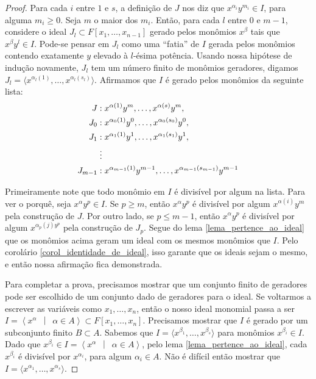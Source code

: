 \documentclass[12pt,a4paper]{report}
\newcommand{\suchthat}{\enspace\middle|\enspace}
\numberwithin{theorem}{chapter}
\begin{document}
\begin{proof}
  Para cada \(i\) entre \(1\) e \(s\), a definição de \(J\) nos diz
  que \(x^{\alpha_i} y^{m_i} \in I\), para alguma \(m_i \geq 0\).
  Seja \(m\) o maior dos \(m_i\).  Então, para cada \(l\) entre \(0\)
  e \(m - 1\), considere o ideal \(J_l \subset F[x_1,\ldots,x_{n-1}]\)
  gerado pelos monômios \(x^\beta\) tais que \(x^\beta y^l \in I\).
  Pode-se pensar em \(J_l\) como uma ``fatia'' de \(I\) gerada pelos
  monômios contendo exatamente \(y\) elevado à \(l\)-ésima potência.
  Usando nossa hipótese de indução novamente, \(J_l\) tem um número
  finito de monômios geradores, digamos \(J_l = \langle
  x^{\alpha_l(1)},\ldots,x^{\alpha_l(s_l)} \rangle\).  Afirmamos
  que \(I\) é gerado pelos monômios da seguinte lista:
  \begin{align*}
    J   &: x^{\alpha(1)}y^m,\ldots,x^{\alpha(s)}y^m,\\
    J_0 &: x^{\alpha_0(1)}y^0,\ldots,x^{\alpha_0(s_0)}y^0,\\
    J_1 &: x^{\alpha_1(1)}y^1,\ldots,x^{\alpha_1(s_1)}y^1,\\
        &\vdotswithin{:}\\
    J_{m-1} &: x^{\alpha_{m-1}(1)}y^{m-1},\ldots,x^{\alpha_{m-1}(s_{m-1})}y^{m-1}
  \end{align*}

  Primeiramente note que todo monômio em \(I\) é divisível por algum
  na lista.  Para ver o porquê, seja \(x^\alpha y^p \in I\).  Se \(p
  \geq m\), então \(x^\alpha y^p\) é divisível por algum
  \(x^{\alpha(i)} y^m\) pela construção de \(J\).  Por outro lado, se
  \(p \leq m - 1\), então \(x^\alpha y^p\) é divisível por algum
  \(x^{\alpha_p(j) y^p}\) pela construção de \(J_p\).  Segue do lema
  \ref{lema_pertence_ao_ideal} que os monômios acima geram um ideal
  com os mesmos monômios que \(I\).  Pelo corolário
  \ref{corol_identidade_de_ideal}, isso garante que os ideais sejam
  o mesmo, e então nossa afirmação fica demonstrada.

  Para completar a prova, precisamos mostrar que um conjunto finito de
  geradores pode ser escolhido de um conjunto dado de geradores para o
  ideal.  Se voltarmos a escrever as variáveis como
  \(x_1,\ldots,x_n\), então o nosso ideal monomial passa a ser \(I =
  \left\langle x^\alpha \suchthat \alpha \in A\right\rangle \subset
  F[x_1,\ldots,x_n]\).  Precisamos mostrar que \(I\) é gerado por um
  subconjunto finito \(B \subset A\).  Sabemos que \(I = \langle
  x^{\beta_1},\ldots,x^{\beta_s}\rangle\) para monômios \(x^{\beta_i}
  \in I\).  Dado que \(x^{\beta_i} \in I = \left\langle x^\alpha
    \suchthat \alpha \in A\right\rangle\), pelo lema
  \ref{lema_pertence_ao_ideal}, cada \(x^{\beta_i}\) é divisível por
  \(x^{\alpha_i}\), para algum \(\alpha_i \in A\).  Não é difícil
  então mostrar que \(I = \langle x^{\alpha_1},\ldots,x^{\alpha_s}
  \rangle\).
\end{proof}
\end{document}
